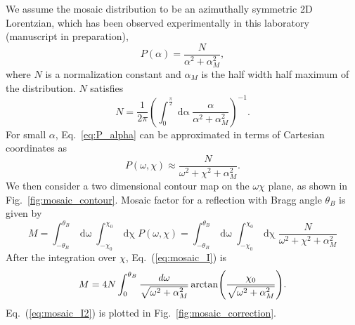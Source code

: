 We assume the mosaic distribution to be an azimuthally symmetric
2D Lorentzian, which has been observed 
experimentally in this laboratory (manuscript in preparation),
\begin{equation}
  P(\alpha) = \frac{N}{\alpha^2+\alpha_M^2},
  \label{eq:P_alpha}
\end{equation}
where $N$ is a normalization constant and $\alpha_M$ is the half width
half maximum of the distribution. $N$ satisfies
\begin{equation}
  N = \frac{1}{2\pi}\left(\int_0^{\frac{\pi}{2}}\mathop{d\alpha}
  \frac{\alpha}{\alpha^2+\alpha_M^2}\right)^{-1}.
  \label{eq:mosaic_N}
\end{equation}
For small $\alpha$, Eq.~\ref{eq:P_alpha} can be approximated in terms of 
Cartesian coordinates as
\begin{equation}
  P(\omega,\chi) \approx \frac{N}{\omega^2+\chi^2+\alpha_M^2}.
\end{equation}
We then consider a two dimensional contour map on the $\omega\chi$ plane,
as shown in Fig.~\ref{fig:mosaic_contour}.
Mosaic factor for a reflection with Bragg angle $\theta_B$ is
given by
\begin{equation}
  M = \int_{-\theta_B}^{\theta_B}\mathop{d\omega} 
  \int_{-\chi_0}^{\chi_0}\mathop{d\chi} P(\omega,\chi)
  = \int_{-\theta_B}^{\theta_B}\mathop{d\omega}
  \int_{-\chi_0}^{\chi_0}\mathop{d\chi}
  \frac{N}{\omega^2+\chi^2+\alpha_M^2}
  \label{eq:mosaic_I}
\end{equation}
After the integration over $\chi$, Eq.~(\ref{eq:mosaic_I}) is
\begin{equation}
  M = 4N\int_0^{\theta_B}\frac{d\omega}{\sqrt{\omega^2+\alpha_M^2}}
  \arctan\mathopen{}\left( \frac{\chi_0}{\sqrt{\omega^2+\alpha_M^2}} \right)\mathclose{}.
  \label{eq:mosaic_I2}
\end{equation}
Eq.~(\ref{eq:mosaic_I2}) is plotted in Fig.~\ref{fig:mosaic_correction}.

